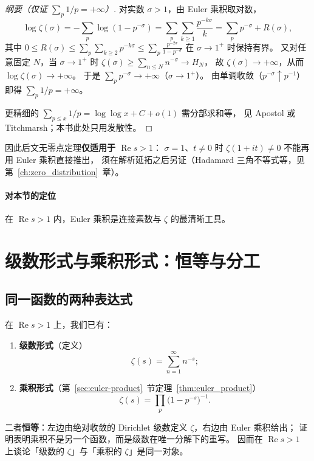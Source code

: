 \begin{proof}[纲要（仅证 $\sum_p 1/p=+\infty$）]
对实数 $\sigma>1$，由 Euler 乘积取对数，
\[
  \log\zeta(\sigma)
  = -\sum_p\log(1-p^{-\sigma})
  = \sum_p\sum_{k\ge 1}\frac{p^{-k\sigma}}{k}
  = \sum_p p^{-\sigma} + R(\sigma),
\]
其中 $0\le R(\sigma)\le\sum_p\sum_{k\ge 2}p^{-k\sigma}\le\sum_p\frac{p^{-2\sigma}}{1-p^{-\sigma}}$ 在 $\sigma\to 1^+$ 时保持有界。
又对任意固定 $N$，当 $\sigma\to 1^+$ 时 $\zeta(\sigma)\ge\sum_{n\le N}n^{-\sigma}\to H_N$，
故 $\zeta(\sigma)\to+\infty$，从而 $\log\zeta(\sigma)\to+\infty$。
于是 $\sum_p p^{-\sigma}\to+\infty$（$\sigma\to 1^+$）。
由单调收敛（$p^{-\sigma}\uparrow p^{-1}$）即得 $\sum_p 1/p=+\infty$。

更精细的 $\sum_{p\le x}1/p=\log\log x+C+o(1)$ 需分部求和等，
见 Apostol 或 Titchmarsh；本书此处只用发散性。
\end{proof}


因此后文无零点定理\textbf{仅适用于 $\operatorname{Re}s>1$}：
$\sigma=1$、$t\neq 0$ 时 $\zeta(1+it)\neq 0$ 不能再用 Euler 乘积直接推出，
须在解析延拓之后另证（Hadamard 三角不等式等，见第~\ref{ch:zero_distribution}~章）。

\paragraph{对本节的定位}
在 $\operatorname{Re}s>1$ 内，Euler 乘积是连接素数与 $\zeta$ 的最清晰工具。

\section{级数形式与乘积形式：恒等与分工}
\label{sec:series_product_roles}

\subsection{同一函数的两种表达式}

在 $\operatorname{Re}s>1$ 上，我们已有：
\begin{enumerate}[label=(\roman*)]
  \item \textbf{级数形式}（定义）
        \[
          \zeta(s)=\sum_{n=1}^{\infty}n^{-s};
        \]
  \item \textbf{乘积形式}（第~\ref{sec:euler-product}~节定理~\ref{thm:euler_product}）
        \[
          \zeta(s)=\prod_{p}\bigl(1-p^{-s}\bigr)^{-1}.
        \]
\end{enumerate}
二者\textbf{恒等}：左边由绝对收敛的 Dirichlet 级数定义 $\zeta$，右边由 Euler 乘积给出；
证明表明乘积不是另一个函数，而是级数在唯一分解下的重写。
因而在 $\operatorname{Re}s>1$ 上谈论「级数的 $\zeta$」与「乘积的 $\zeta$」是同一对象。

